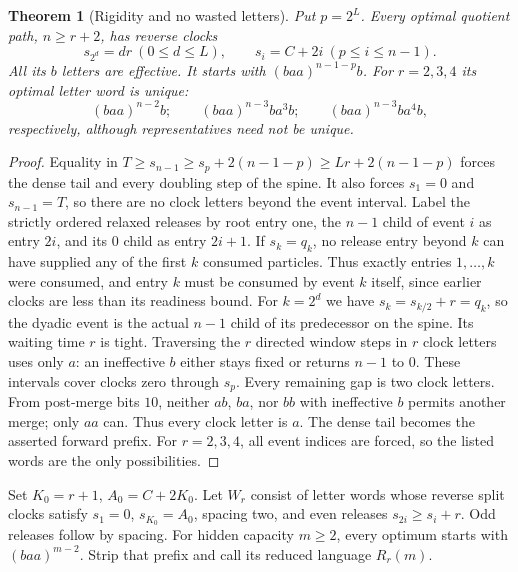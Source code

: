 \documentclass[11pt]{article}
\newtheorem{theorem}{Theorem}
\begin{document}
\begin{theorem}[Rigidity and no wasted letters]\label{thm:rigidity}
Put $p=2^L$. Every optimal quotient path, $n\ge r+2$, has reverse clocks
\[
s_{2^d}=dr\ (0\le d\le L),\qquad s_i=C+2i\ (p\le i\le n-1).
\]
All its $b$ letters are effective. It starts with $(baa)^{n-1-p}b$.
For $r=2,3,4$ its optimal letter word is unique:
\[
(baa)^{n-2}b;\qquad (baa)^{n-3}ba^3b;\qquad(baa)^{n-3}ba^4b,
\]
respectively, although representatives need not be unique.
\end{theorem}
\begin{proof}
Equality in $T\ge s_{n-1}\ge s_p+2(n-1-p)\ge Lr+2(n-1-p)$ forces
the dense tail and every doubling step of the spine. It also forces
$s_1=0$ and $s_{n-1}=T$, so there are no clock letters beyond the event
interval. Label the strictly ordered relaxed releases by root entry one,
the $n-1$ child of event $i$ as entry $2i$, and its $0$ child as entry
$2i+1$. If $s_k=q_k$, no release entry beyond $k$ can have supplied any
of the first $k$ consumed particles. Thus exactly entries $1,\ldots,k$
were consumed, and entry $k$ must be consumed by event $k$ itself, since
earlier clocks are less than its readiness bound. For $k=2^d$ we have
$s_k=s_{k/2}+r=q_k$, so the dyadic event is the actual $n-1$ child of
its predecessor on the spine. Its waiting time $r$ is tight. Traversing
the $r$ directed window steps in $r$ clock letters uses only $a$: an
ineffective $b$ either stays fixed or returns $n-1$ to $0$. These intervals
cover clocks zero through $s_p$.
Every remaining gap is two clock letters. From post-merge bits $10$,
neither $ab$, $ba$, nor $bb$ with ineffective $b$ permits another merge;
only $aa$ can. Thus every clock letter is $a$. The dense tail becomes
the asserted forward prefix. For $r=2,3,4$, all event indices are forced,
so the listed words are the only possibilities.
\end{proof}

Set $K_0=r+1$, $A_0=C+2K_0$. Let $W_r$ consist of letter words whose
reverse split clocks satisfy $s_1=0$, $s_{K_0}=A_0$, spacing two, and
even releases $s_{2i}\ge s_i+r$. Odd releases follow by spacing.
For hidden capacity $m\ge2$, every optimum starts with $(baa)^{m-2}$.
Strip that prefix and call its reduced language $R_r(m)$.
\end{document}
